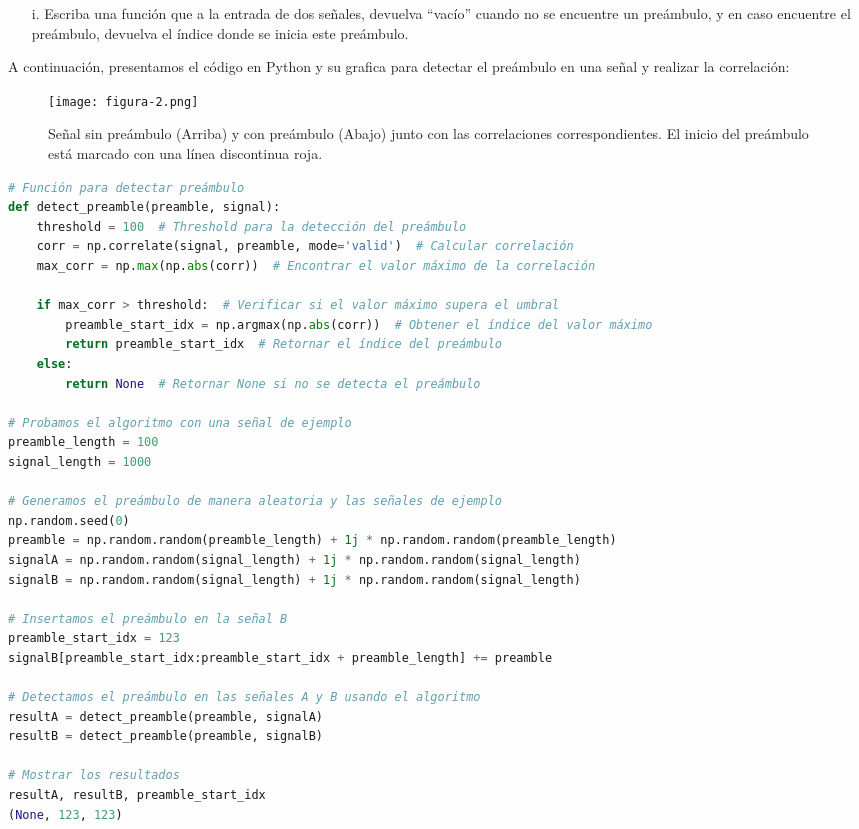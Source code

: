 \documentclass[letterpaper,12pt,oneside]{article}
\begin{document}
\begin{itemize}
    \item[i.] Escriba una función que a la entrada de dos señales, devuelva “vacío” cuando no se encuentre un preámbulo, y en caso encuentre el preámbulo, devuelva el índice donde se inicia este preámbulo.
\end{itemize}

A continuación, presentamos el código en Python y su grafica para detectar el preámbulo en una señal y realizar la correlación:

\begin{figure}[H]
    \centering
    \texttt{[image: figura-2.png]}
    \caption{Señal sin preámbulo (Arriba) y con preámbulo (Abajo) junto con las correlaciones correspondientes. El inicio del preámbulo está marcado con una línea discontinua roja.}
    \label{fig:detec_preambulo}
\end{figure}

\begin{tcolorbox}[colback=black!5!white,colframe=black!80!white,title=Código Python: Detección de preámbulo mediante correlación, fonttitle=\bfseries]
\begin{lstlisting}[language=Python, basicstyle=\ttfamily\footnotesize, breaklines=true]
# Función para detectar preámbulo
def detect_preamble(preamble, signal):
    threshold = 100  # Threshold para la detección del preámbulo
    corr = np.correlate(signal, preamble, mode='valid')  # Calcular correlación
    max_corr = np.max(np.abs(corr))  # Encontrar el valor máximo de la correlación
    
    if max_corr > threshold:  # Verificar si el valor máximo supera el umbral
        preamble_start_idx = np.argmax(np.abs(corr))  # Obtener el índice del valor máximo
        return preamble_start_idx  # Retornar el índice del preámbulo
    else:
        return None  # Retornar None si no se detecta el preámbulo

# Probamos el algoritmo con una señal de ejemplo
preamble_length = 100
signal_length = 1000

# Generamos el preámbulo de manera aleatoria y las señales de ejemplo
np.random.seed(0)
preamble = np.random.random(preamble_length) + 1j * np.random.random(preamble_length)
signalA = np.random.random(signal_length) + 1j * np.random.random(signal_length)
signalB = np.random.random(signal_length) + 1j * np.random.random(signal_length)

# Insertamos el preámbulo en la señal B
preamble_start_idx = 123
signalB[preamble_start_idx:preamble_start_idx + preamble_length] += preamble

# Detectamos el preámbulo en las señales A y B usando el algoritmo 
resultA = detect_preamble(preamble, signalA)
resultB = detect_preamble(preamble, signalB)

# Mostrar los resultados
resultA, resultB, preamble_start_idx
(None, 123, 123)
\end{lstlisting}
\end{tcolorbox}
\end{document}
